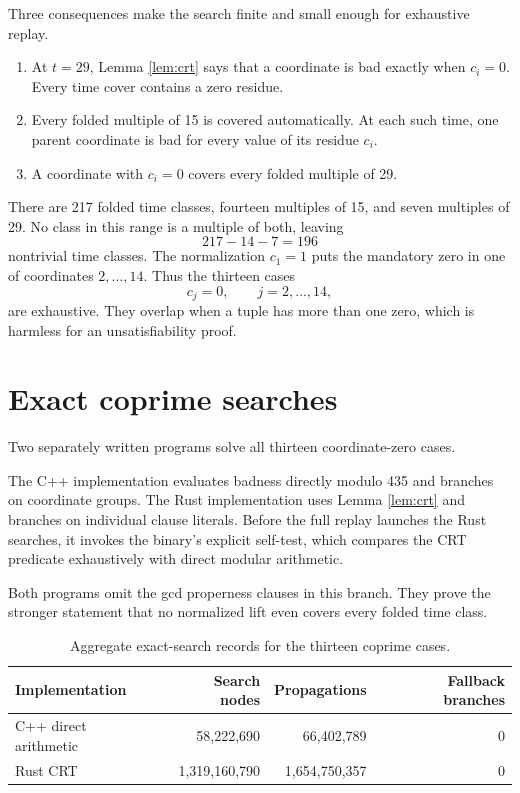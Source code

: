 \documentclass[11pt]{article}
\begin{document}
Three consequences make the search finite and small enough for exhaustive
replay.

\begin{enumerate}[leftmargin=2.2em]
  \item At \(t=29\), Lemma \ref{lem:crt} says that a coordinate is bad
        exactly when \(c_i=0\).  Every time cover contains a zero residue.
  \item Every folded multiple of 15 is covered automatically.  At each such
        time, one parent coordinate is bad for every value of its residue
        \(c_i\).
  \item A coordinate with \(c_i=0\) covers every folded multiple of 29.
\end{enumerate}

There are 217 folded time classes, fourteen multiples of 15, and seven
multiples of 29.  No class in this range is a multiple of both, leaving
\[
  217-14-7=196
\]
nontrivial time classes.  The normalization \(c_1=1\) puts the mandatory
zero in one of coordinates \(2,\ldots,14\).  Thus the thirteen cases
\[
  c_j=0,\qquad j=2,\ldots,14,
\]
are exhaustive.  They overlap when a tuple has more than one zero, which is
harmless for an unsatisfiability proof.

\section{Exact coprime searches}

Two separately written programs solve all thirteen coordinate-zero cases.

The C++ implementation evaluates badness directly modulo 435 and branches
on coordinate groups.  The Rust implementation uses Lemma \ref{lem:crt}
and branches on individual clause literals.  Before the full replay launches
the Rust searches, it invokes the binary's explicit self-test, which compares
the CRT predicate exhaustively with direct modular arithmetic.

Both programs omit the gcd properness clauses in this branch.  They prove
the stronger statement that no normalized lift even covers every folded
time class.

\begin{table}[htbp]
\centering
\caption{Aggregate exact-search records for the thirteen coprime cases.}
\label{tab:coprime-search}
\begin{tabular}{lrrr}
\toprule
Implementation & Search nodes & Propagations & Fallback branches\\
\midrule
C++ direct arithmetic & 58,222,690 & 66,402,789 & 0\\
Rust CRT              & 1,319,160,790 & 1,654,750,357 & 0\\
\bottomrule
\end{tabular}
\end{table}
\end{document}
